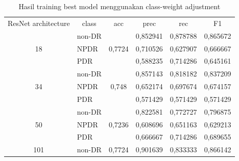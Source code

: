     \begin{table}[h!]
        \begin{center}
        \caption{Hasil training best model menggunakan class-weight adjustment}
        \label{tb:HasilTrainClassWeight}
            \begin{tabular}{clclll}
            \cline{1-6}
            ResNet   architecture & \multicolumn{1}{c}{class} & acc                     & \multicolumn{1}{c}{prec} & \multicolumn{1}{c}{rec} & \multicolumn{1}{c}{F1} \\ \cline{1-6}
            \multirow{3}{*}{18}   & non-DR                    & \multirow{3}{*}{0,7724} & 0,852941                 & 0,878788                & 0,865672               \\
                                  & NPDR                      &                         & 0,710526                 & 0,627907                & 0,666667               \\
                                  & PDR                       &                         & 0,588235                 & 0,714286                & 0,645161               \\ \cline{1-6}
            \multirow{3}{*}{34}   & non-DR                    & \multirow{3}{*}{0,748}  & 0,857143                 & 0,818182                & 0,837209               \\
                                  & NPDR                      &                         & 0,652174                 & 0,697674                & 0,674157               \\
                                  & PDR                       &                         & 0,571429                 & 0,571429                & 0,571429               \\ \cline{1-6}
            \multirow{3}{*}{50}   & non-DR                    & \multirow{3}{*}{0,7236} & 0,822581                 & 0,772727                & 0,796875               \\
                                  & NPDR                      &                         & 0,608696                 & 0,651163                & 0,629213               \\
                                  & PDR                       &                         & 0,666667                 & 0,714286                & 0,689655               \\ \cline{1-6}
            \multirow{3}{*}{101}  & non-DR                    & \multirow{3}{*}{0,7724} & 0,901639                 & 0,833333                & 0,866142               \\

\end{tabular}
\end{center}
\end{table}
